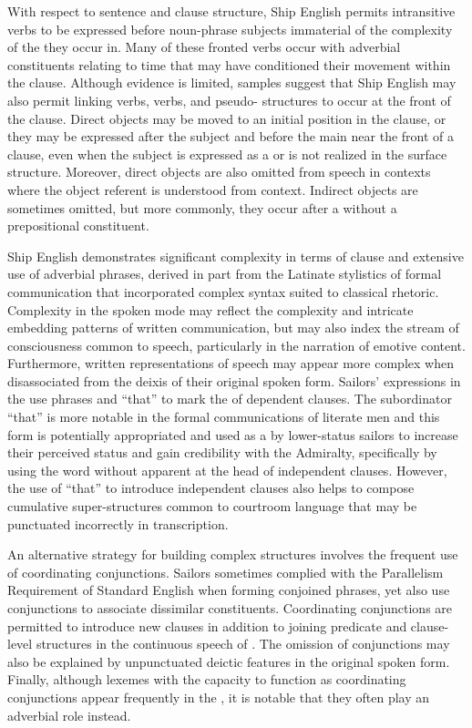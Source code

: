 With respect to sentence and clause structure, Ship English permits intransitive verbs to be expressed before noun-phrase subjects immaterial of the complexity of the  they occur in. Many of these fronted verbs occur with adverbial constituents relating to time that may have conditioned their movement within the clause. Although evidence is limited, samples suggest that Ship English may also permit linking verbs,  verbs, and pseudo- structures to occur at the front of the clause. Direct objects may be moved to an initial position in the clause, or they may be expressed after the subject and before the main  near the front of a clause, even when the subject is expressed as a  or is not realized in the surface structure. Moreover, direct objects are also omitted from speech in contexts where the object referent is understood from context.  Indirect objects are sometimes omitted, but more commonly, they occur after a  without a prepositional constituent. 

Ship English demonstrates significant complexity in terms of clause  and extensive use of adverbial phrases, derived in part from the Latinate stylistics of formal communication that incorporated complex syntax suited to classical rhetoric. Complexity in the spoken mode may reflect the complexity and intricate embedding patterns of written communication, but may also index the stream of consciousness common to speech, particularly in the narration of emotive content. Furthermore, written representations of speech may appear more complex when disassociated from the deixis of their original spoken form. Sailors’ expressions in the  use  phrases and “that” to mark the  of dependent clauses. The subordinator “that” is more notable in the formal communications of literate men and this form is potentially appropriated and used as a  by lower-status sailors to increase their perceived status and gain credibility with the Admiralty, specifically by using the word without apparent  at the head of independent clauses. However, the use of “that” to introduce independent clauses also helps to compose cumulative super-structures common to courtroom language that may be punctuated incorrectly in transcription. 

An alternative strategy for building complex structures involves the frequent use of coordinating conjunctions. Sailors sometimes complied with the Parallelism Requirement of Standard English when forming conjoined phrases, yet also use conjunctions to associate dissimilar constituents. Coordinating conjunctions are permitted to introduce new clauses in addition to joining predicate and clause-level structures in the continuous speech of . The omission of conjunctions may also be explained by unpunctuated deictic features in the original spoken form. Finally, although lexemes with the capacity to function as coordinating conjunctions appear frequently in the , it is notable that they often play an adverbial role instead. 

